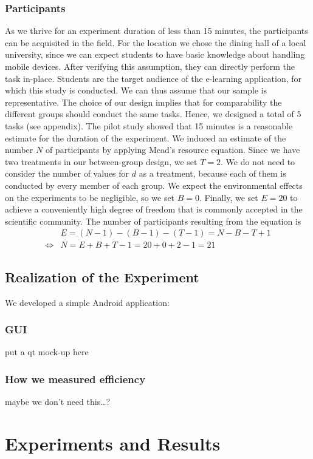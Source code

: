 \documentclass{sig-alternate-05-2015}
\begin{document}
\subsubsection{Participants}
As we thrive for an experiment duration of less than 15 minutes, the
participants can be acquisited in the field.  For the location we chose the
dining hall of a local university, since we can expect students to have basic
knowledge about handling mobile devices.  After verifying this assumption,
they can directly perform the task in-place.  Students are the target audience
of the e-learning application, for which this study is conducted.  We can thus
assume that our sample is representative.
The choice of our design implies that for comparability the different groups 
should conduct the same tasks. Hence, we designed a total of 5 tasks (see appendix).
The pilot study showed that 15 minutes is a reasonable estimate for the duration
of the experiment.
We induced an estimate of the number $N$ of participants by applying Mead's resource equation.
Since we have two treatments in our between-group design, we set $T = 2$. We do not need
to consider the number of values for $d$ as a treatment, because each of them is conducted by
every member of each group. We expect the environmental effects on the experiments to be
negligible, so we set $B = 0$. Finally, we set $E = 20$ to achieve a conveniently high degree
of freedom that is commonly accepted in the scientific community. The number of participants
resulting from the equation is
\begin{align*}
& E = (N - 1) - (B - 1) - (T - 1) = N - B - T + 1 \\
\Leftrightarrow & N = E + B + T - 1 = 20 + 0 + 2 - 1 = 21
\end{align*}
\subsection{Realization of the Experiment}
We developed a simple Android application:
\subsubsection{GUI}
put a qt mock-up here
\subsubsection{How we measured efficiency}
maybe we don't need this\ldots?
\section{Experiments and Results}
\end{document}
